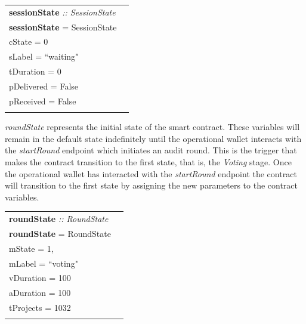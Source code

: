 \documentclass[12pt]{article}
\begin{document}
\begin{tabular}{lr}
\textbf{sessionState} \emph{:: SessionState}\\
\textbf{sessionState}  = SessionState  \textbraceleft{}
\\ \hspace{55mm}cState = 0
\\ \hspace{55mm}sLabel = ``waiting"
\\ \hspace{55mm}tDuration = 0
\\ \hspace{55mm}pDelivered = False
\\ \hspace{55mm}pReceived = False
\\\hspace{51mm}\textbraceright{} 
\end{tabular}



 \emph{roundState} represents the initial state of the smart contract. These variables will remain in the default state indefinitely until the operational wallet interacts with the \emph{startRound} endpoint which initiates an audit round. This is the trigger that makes the contract transition to the first state, that is, the \emph{Voting} stage.
 Once the operational wallet has interacted with the \emph{startRound} endpoint the contract will transition to the first state by assigning the new parameters to the contract variables.
\\

\begin{tabular}{lr}
\textbf{roundState} \emph{:: RoundState}\\
\textbf{roundState}  = RoundState  \textbraceleft{}
\\ \hspace{55mm}mState = 1,
\\ \hspace{55mm}mLabel = ``voting"
\\ \hspace{55mm}vDuration = 100
\\ \hspace{55mm}aDuration = 100
\\ \hspace{55mm}tProjects = 1032
\\\hspace{50mm}\textbraceright{} 
\end{tabular}
\end{document}
